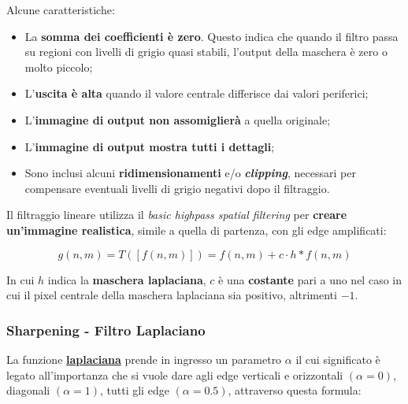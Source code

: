 \documentclass[a4paper]{article}
\begin{document}
	\noindent
	Alcune caratteristiche:
	
	\begin{itemize}
		\item La \textbf{somma dei coefficienti è zero}. Questo indica che quando il filtro passa su regioni con livelli di grigio quasi stabili, l'output della maschera è zero o molto piccolo;
		
		\item L'\textbf{uscita è alta} quando il valore centrale differisce dai valori periferici;
		
		\item L'\textbf{immagine di output non assomiglierà} a quella originale;
		
		\item L'\textbf{immagine di output mostra tutti i dettagli};
		
		\item Sono inclusi alcuni \textbf{ridimensionamenti} e/o \emph{\textbf{clipping}}, necessari per compensare eventuali livelli di grigio negativi dopo il filtraggio.
	\end{itemize}

	\noindent
	Il filtraggio lineare utilizza il \emph{basic highpass spatial filtering} per \textbf{creare un'immagine realistica}, simile a quella di partenza, con gli edge amplificati:
	
	\begin{equation*}
		g\left(n,m\right) = T\left(\left[f\left(n,m\right)\right]\right) = f\left(n,m\right) + c \cdot h * f\left(n,m\right)
	\end{equation*}

	\noindent
	In cui $h$ indica la \textbf{maschera laplaciana}, $c$ è una \textbf{costante} pari a uno nel caso in cui il pixel centrale della maschera laplaciana sia positivo, altrimenti $-1$.
	
	\newpage
	
	\subsubsection{Sharpening - Filtro Laplaciano}
	
	La funzione \textcolor{Red3}{\textbf{\underline{laplaciana}}} prende in ingresso un parametro $\alpha$ il cui significato è legato all'importanza che si vuole dare agli edge verticali e orizzontali $\left(\alpha = 0\right)$, diagonali $\left(\alpha = 1\right)$, tutti gli edge $\left(\alpha = 0.5\right)$, attraverso questa formula:
	
\end{document}
